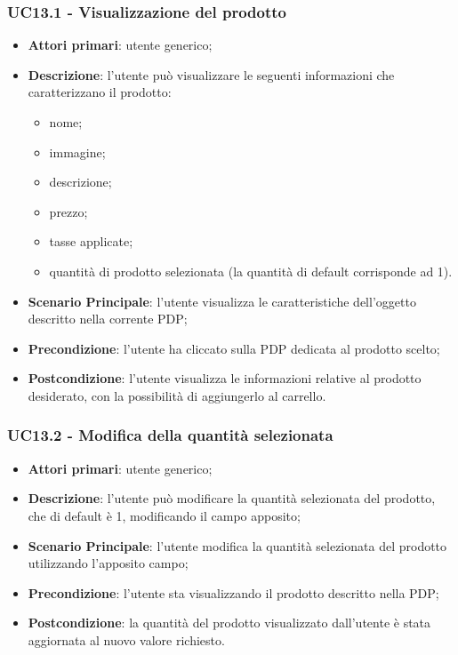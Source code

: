 \subsubsection{UC13.1 - Visualizzazione del prodotto}
\begin{itemize}
\item \textbf{Attori primari}: utente generico;
\item \textbf{Descrizione}: l'utente può visualizzare le seguenti informazioni che caratterizzano il prodotto:
\begin{itemize}
\item nome;
\item immagine;
\item descrizione;
\item prezzo;
\item tasse applicate;
\item quantità di prodotto selezionata (la quantità di default corrisponde ad 1).
\end{itemize}
\item \textbf{Scenario Principale}: l'utente visualizza le caratteristiche dell'oggetto descritto nella corrente PDP;
\item \textbf{Precondizione}: l'utente ha cliccato sulla PDP dedicata al prodotto scelto;
\item \textbf{Postcondizione}: l'utente visualizza le informazioni relative al prodotto desiderato, con la possibilità di aggiungerlo al carrello.
\end{itemize}

\subsubsection{UC13.2 - Modifica della quantità selezionata}
\begin{itemize}
\item \textbf{Attori primari}: utente generico;
\item \textbf{Descrizione}: l'utente può modificare la quantità selezionata del prodotto, che di default è 1, modificando il campo apposito;
\item \textbf{Scenario Principale}: l'utente modifica la quantità selezionata del prodotto utilizzando l'apposito campo;
\item \textbf{Precondizione}: l'utente sta visualizzando il prodotto descritto nella PDP;
\item \textbf{Postcondizione}: la quantità del prodotto visualizzato dall'utente è stata aggiornata al nuovo valore richiesto.
\end{itemize}

